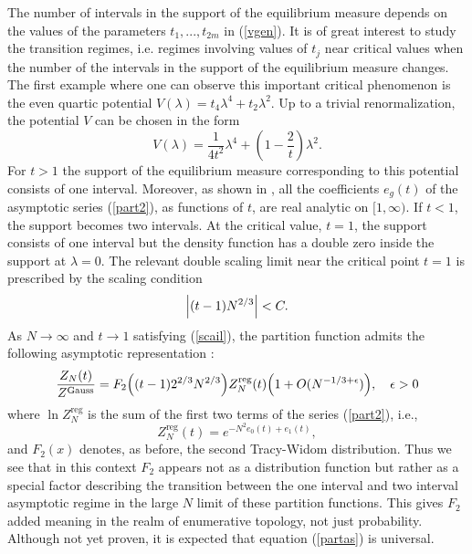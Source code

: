 \documentclass[11pt,letterpaper,reqno]{amsart}
\theoremstyle{definition}
\theoremstyle{remark}
\numberwithin{equation}{section}
\begin{document}
The number of  intervals in the support of the  equilibrium measure
depends on the values of the parameters $t_1, ..., t_{2m}$
in (\ref{vgen}). It is of great interest to
study the transition regimes, i.e. regimes involving values of $t_j$
near  critical values  when the number
of the intervals in the support of the equilibrium measure changes.
The first example where one can observe this important  critical
phenomenon is the  even quartic potential $V(\lambda) =
t_4\lambda^4 + t_2\lambda^2$. Up to a trivial renormalization, the
potential $V$  can
be chosen in the form
\begin{equation}\label{quartic1}
V(\lambda) = \frac{1}{4t^2}\lambda^4 + \left(1-\frac{2}{t}\right)\lambda^2.
\end{equation}
For $t>1$ the support of the  equilibrium measure corresponding  to
this potential consists of one interval.
Moreover, as shown in \cite{BI}, all the coefficients $e_{g}(t)$ of the
asymptotic series (\ref{part2}), as functions of $t$,  are real analytic on $[1, \infty)$.
If $t <1$, the support becomes   two intervals.
At the critical value, $t = 1$, the support consists of one interval but the
density function has a double zero inside the support at $\lambda =0$.
The relevant double scaling limit near the critical point $t =1$ is prescribed
by the scaling condition
\begin{equation}\label{scail}
\Bigl|(t-1)N^{2/3}\Bigr| < C.
\end{equation}
As $N \to \infty$ and  $ t \to 1$ satisfying (\ref{scail}), the partition function  admits the
following asymptotic representation \cite{BI}:
\begin{equation}\label{partas}
\frac{Z_N(t)}{Z^{\textrm{Gauss}}} = F_2\Bigl((t-1)2^{2/3}N^{2/3}\Bigr)Z^{\textrm{reg}}_{N}(t)\Bigl(1 + O(N^{-1/3 + \epsilon})\Bigr),\quad \epsilon >0
\end{equation}
where $\ln Z^{\textrm{reg}}_{N}$ is the sum of the first two terms of the series (\ref{part2}), i.e.,
$$
Z^{\textrm{reg}}_{N}(t) = e^{-N^2e_0(t) + e_1(t)},
$$
and $F_2(x)$ denotes, as before, the second Tracy-Widom distribution. Thus we see that in this context $F_2$ appears not as a distribution function but rather as a special factor describing the transition between the one interval and two interval asymptotic regime in the large $N$ limit of these partition functions. This gives $F_2$ added meaning in the realm of enumerative topology, not just probability.
Although not yet proven, it is expected that equation (\ref{partas}) is universal.
\end{document}

